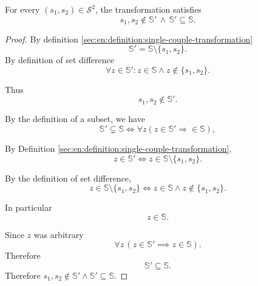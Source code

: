 \begin{proposition}
    \begin{statement}
        For every $(s_1,s_2)\in\mathcal{S}^2$, the transformation satisfies
        $$s_1,s_2\notin\mathbb{S}'\,\land\,\mathbb{S}'\subseteq\mathbb{S}.$$
    \end{statement}
    \begin{proof}
        By definition \ref{sec:en:definition:single-couple-transformation}
        $$\mathbb{S}'=\mathbb{S}\setminus\{s_1,s_2\}.$$
        By definition of set difference
        $$\forall z\in\mathbb S': z\in\mathbb S\land z\notin\{s_1,s_2\}.$$

        Thus
        $$s_1,s_2\notin\mathbb S'.$$

        By the definition of a subset, we have
        $$\mathbb{S}'\subsetneq\mathbb{S} \Longleftrightarrow \forall z(z\in\mathbb{S}'\Rightarrow\in\mathbb{S}),$$

        By Definition \ref{sec:en:definition:single-couple-transformation},
        $$z\in\mathbb S'\iff z\in\mathbb S\setminus\{s_1,s_2\}.$$

        By the definition of set difference,
        $$
        z\in\mathbb S\setminus\{s_1,s_2\}
        \iff
        z\in\mathbb S\land z\notin\{s_1,s_2\}.
        $$

        In particular
        $$z\in\mathbb S.$$

        Since $z$ was arbitrary
        $$\forall z\,(z\in\mathbb S'\implies z\in\mathbb S).$$
        Therefore
        $$\mathbb S'\subseteq\mathbb S.$$
        Therefore $s_1,s_2\notin\mathbb S'\land\mathbb S'\subseteq\mathbb S$.
    \end{proof}
\end{proposition}

